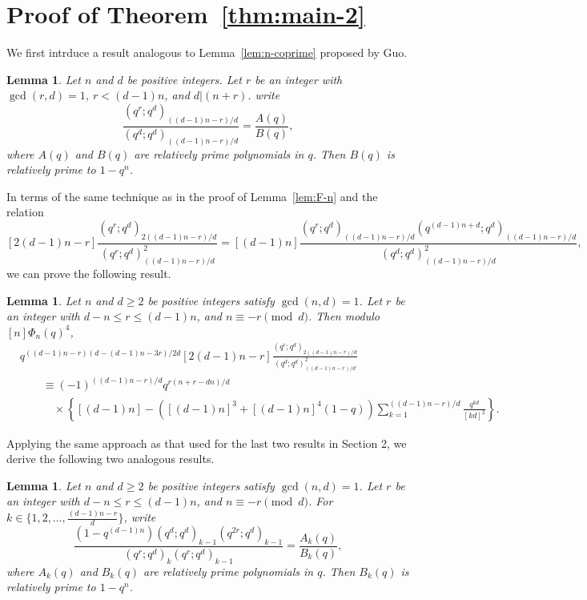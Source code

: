 \documentclass[12pt]{article}
\newtheorem{lem}[thm]{Lemma}
\numberwithin{equation}{section}
\begin{document}
\section{Proof of Theorem~\ref{thm:main-2}}
We first intrduce a result analogous to Lemma~\ref{lem:n-coprime} proposed by Guo\cite[Lemma~4.1]{Guo-qE2F2}.
\begin{lem}
    Let $n$ and $d$ be positive integers. Let $r$ be an integer with $\gcd(r,d)=1$, $r<(d-1)n$, and $d|(n+r)$. write 
    \[\frac{(q^r;q^d)_{((d-1)n-r)/d}}{(q^d;q^d)_{((d-1)n-r)/d}}=\frac{A(q)}{B(q)},\]
    where $A(q)$ and $B(q)$ are relatively prime polynomials in $q$. Then $B(q)$ is relatively prime to $1-q^n$.
\end{lem}
In terms of the same technique as in the proof of Lemma~\ref{lem:F-n} and the relation
\[[2(d-1)n-r]\frac{(q^r;q^d)_{2((d-1)n-r)/d}}{(q^r;q^d)^2_{((d-1)n-r)/d}}=[(d-1)n]\frac{(q^r;q^d)_{((d-1)n-r)/d}(q^{(d-1)n+d};q^d)_{((d-1)n-r)/d}}
{(q^d;q^d)^2_{((d-1)n-r)/d}},\]
we can prove the following result.
\begin{lem}\label{lem:F-dn}
    Let $n$ and $d\geqslant2$ be positive integers satisfy $\gcd(n,d)=1$. Let $r$ be an integer with $d-n\leqslant r\leqslant (d-1)n$, and $n\equiv -r\pmod{d}$.
    Then modulo $[n]\Phi_n(q)^4$,
    \begin{align*}\label{eq:F-dn}
        &q^{((d-1)n-r)(d-(d-1)n-3r)/2d}[2(d-1)n-r]\frac{(q^r;q^d)_{2((d-1)n-r)/d}}{(q^d;q^d)^2_{((d-1)n-r)/d}}\nonumber\\
        &\hspace{2em}\equiv(-1)^{((d-1)n-r)/d} q^{r(n+r-dn)/d}\nonumber\\
        &\hspace{3em}\times\left\{[(d-1)n]-([(d-1)n]^3+[(d-1)n]^4(1-q))\sum_{k=1}^{((d-1)n-r)/d}\frac{q^{kd}}{[kd]^2}\right\}.
    \end{align*}
\end{lem}
Applying the same approach as that used for the last two results in Section 2, we derive the following two analogous results.

\begin{lem}\label{lem:G-div-dn}
    Let $n$ and $d\geqslant2$ be positive integers satisfy $\gcd(n,d)=1$. Let $r$ be an integer with $d-n\leqslant r\leqslant (d-1)n$, and $n\equiv -r\pmod{d}$.
    For $k\in \{1,2,\dots, \frac{(d-1)n-r}{d}\}$, write \[\frac{(1-q^{(d-1)n})(q^d;q^d)_{k-1}(q^{2r};q^d)_{k-1}}{(q^r;q^d)_{k}(q^r;q^d)_{k-1}}
    =\frac{A_k(q)}{B_k(q)},\] where $A_k(q)$ and $B_k(q)$ are relatively prime polynomials in $q$. Then $B_k(q)$ is relatively prime to $1-q^n$.
\end{lem}
    
\end{document}
